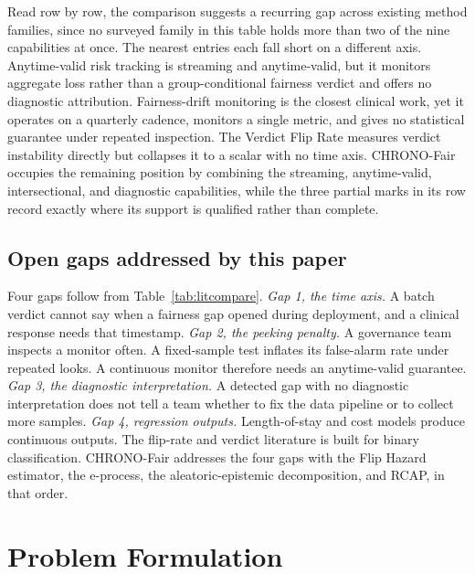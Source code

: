 \documentclass[acmsmall,nonacm,review,anonymous]{acmart}
\newcommand{\1}[1]{\mathbf{1}\!\left\{#1\right\}}
\begin{document}
Read row by row, the comparison suggests a recurring gap across existing method families, since no surveyed family in this table holds more than two of the nine capabilities at once. The nearest entries each fall short on a different axis. Anytime-valid risk tracking \cite{podkopaev2023} is streaming and anytime-valid, but it monitors aggregate loss rather than a group-conditional fairness verdict and offers no diagnostic attribution. Fairness-drift monitoring \cite{davis2025} is the closest clinical work, yet it operates on a quarterly cadence, monitors a single metric, and gives no statistical guarantee under repeated inspection. The Verdict Flip Rate \cite{joy2025vfr} measures verdict instability directly but collapses it to a scalar with no time axis. CHRONO-Fair occupies the remaining position by combining the streaming, anytime-valid, intersectional, and diagnostic capabilities, while the three partial marks in its row record exactly where its support is qualified rather than complete.

\subsection{Open gaps addressed by this paper}

Four gaps follow from Table~\ref{tab:litcompare}. \emph{Gap 1, the time axis.} A batch verdict cannot say when a fairness gap opened during deployment, and a clinical response needs that timestamp. \emph{Gap 2, the peeking penalty.} A governance team inspects a monitor often. A fixed-sample test inflates its false-alarm rate under repeated looks. A continuous monitor therefore needs an anytime-valid guarantee. \emph{Gap 3, the diagnostic interpretation.} A detected gap with no diagnostic interpretation does not tell a team whether to fix the data pipeline or to collect more samples. \emph{Gap 4, regression outputs.} Length-of-stay and cost models produce continuous outputs. The flip-rate and verdict literature is built for binary classification. CHRONO-Fair addresses the four gaps with the Flip Hazard estimator, the e-process, the aleatoric-epistemic decomposition, and RCAP, in that order.

\section{Problem Formulation}\label{sec:problem}
\end{document}
